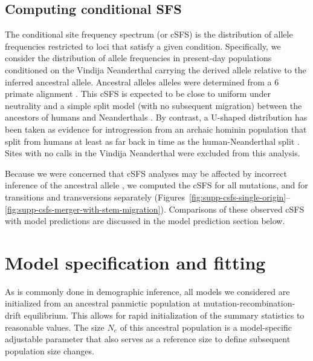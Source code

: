 \documentclass[]{article}
\begin{document}
\subsection{Computing conditional SFS}\label{sec:computing-csfs}

The conditional site frequency spectrum (or cSFS) is the distribution of allele
frequencies restricted to loci that satisfy a given condition. Specifically, we
consider the distribution of allele frequencies in present-day populations
conditioned on the Vindija Neanderthal carrying the derived allele relative to
the inferred ancestral allele. Ancestral alleles alleles were determined from a
6 primate alignment \citep{1000_Genomes_Project_Consortium2015-zq}.
This cSFS is expected to be close to
uniform under neutrality and a simple split model (with no subsequent
migration) between the ancestors of humans and Neanderthals
\citep{Chen2007-iy}. By contrast, a U-shaped distribution has been taken as
evidence for introgression from an archaic hominin population that split
from humans at least as far back in time as the human-Neanderthal split
\citep{Yang2012-ze,Durvasula2020-td}.
Sites with no calls in the Vindija Neanderthal were excluded from
this analysis.

Because we were concerned that cSFS analyses may be affected by incorrect
inference of the ancestral allele \citep{Hernandez2007-mf}, we computed the cSFS
for all mutations, and for transitions and transversions separately
(Figures~\ref{fig:supp-csfs-single-origin}--\ref{fig:supp-csfs-merger-with-stem-migration}).
Comparisons of these observed cSFS with model
predictions are discussed in the model prediction section below. 

\section{Model specification and fitting}
\label{modelspec}

As is commonly done in demographic inference, 
all models we considered are initialized from an ancestral panmictic population at 
mutation-recombination-drift equilibrium. This allows for rapid initialization of the 
summary statistics to reasonable values.
The size $N_e$ of this ancestral population is a model-specific adjustable parameter 
that also serves as a reference size to define subsequent population size changes.   
\end{document}
